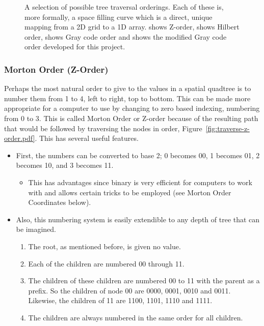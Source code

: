 \begin{figure}[tbh]
	\caption[A selection of possible tree traversal orderings]{A selection of
		possible tree traversal orderings. Each of these is, more formally, a
		space filling curve which is a direct, unique mapping from a 2D grid to
		a 1D array.  shows Z-order,
		 shows Hilbert order,
		 shows Gray code order and
		 shows the modified Gray code
		order developed for this project.}\label{fig:order_traversals}
\end{figure}

\subsubsection[Morton Order]{Morton Order (Z-Order)}
\label{ssub:morton_code_z_order_}

Perhaps the most natural order to give to the values in a spatial quadtree is
to number them from 1 to 4, left to right, top to bottom. This can be made more
appropriate for a computer to use by changing to zero based indexing,
numbering from 0 to 3. This is called Morton Order \cite{mortoncomputer} or
Z-order because of the resulting path that would be followed by traversing the
nodes in order, Figure~\ref{fig:traverse-z-order.pdf}. This has several useful
features.

\begin{itemize}
	\item First, the numbers can be converted to base 2; 0 becomes 00, 1
		becomes 01, 2 becomes 10, and 3 becomes 11.

		\begin{itemize}
			\item This has advantages since binary is very efficient for
				computers to work with and allows certain tricks to be employed
				(see Morton Order Coordinates below).
		\end{itemize}

	\item Also, this numbering system is easily extendible to any depth of
	tree that can be imagined.

	\begin{enumerate}

		\item The root, as mentioned before, is given no value.

		\item Each of the children are numbered {00} through 11.

		\item The children of these children are numbered 00 to 11 with the
			parent as a prefix. So the children of node 00 are 0000, 0001, 0010
			and 0011. Likewise, the children of 11 are 1100, 1101, 1110 and
			1111.

		\item The children are always numbered in the same order for all
			children.

	\end{enumerate}
\end{itemize}

